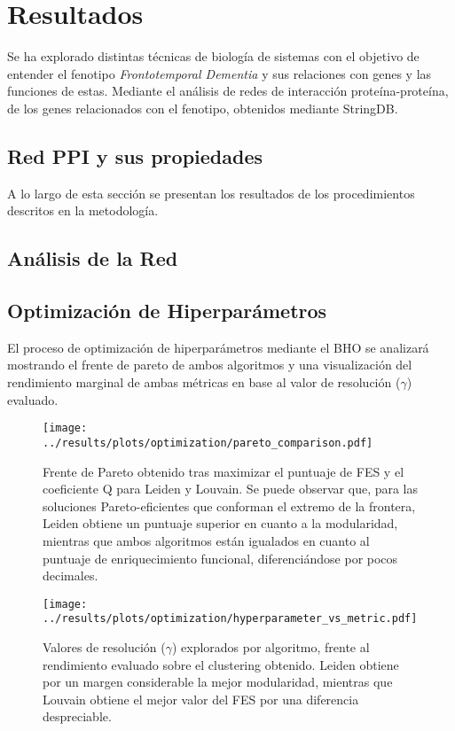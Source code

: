 \section{Resultados}
Se ha explorado distintas técnicas de biología de sistemas con el objetivo de entender el fenotipo \textit{Frontotemporal Dementia} y sus relaciones con genes y las funciones de estas. 
Mediante el análisis de redes de interacción proteína-proteína, de los genes relacionados con el fenotipo, obtenidos mediante StringDB.

\subsection{Red PPI y sus propiedades}




A lo largo de esta sección se presentan los resultados de los procedimientos descritos en la metodología. 

\subsection{Análisis de la Red}

\subsection{Optimización de Hiperparámetros}

El proceso de optimización de hiperparámetros mediante el BHO se analizará mostrando el frente de pareto de ambos algoritmos y una visualización del rendimiento marginal de ambas métricas en base al valor de resolución (\(\gamma\)) evaluado.

\begin{figure}[htbp]
	\centering
	\texttt{[image: ../results/plots/optimization/pareto\_comparison.pdf]}
	\caption{Frente de Pareto obtenido tras maximizar el puntuaje de FES y el coeficiente Q para Leiden y Louvain. Se puede observar que, para las soluciones Pareto-eficientes que conforman el extremo de la frontera, Leiden obtiene un puntuaje superior en cuanto a la modularidad, mientras que ambos algoritmos están igualados en cuanto al puntuaje de enriquecimiento funcional, diferenciándose por pocos decimales.}
	\label{fig:pareto}
\end{figure}

\begin{figure}[htbp]
	\centering
	\texttt{[image: ../results/plots/optimization/hyperparameter\_vs\_metric.pdf]}
	\caption{Valores de resolución (\(\gamma\)) explorados por algoritmo, frente al rendimiento evaluado sobre el clustering obtenido. Leiden obtiene por un margen considerable la mejor modularidad, mientras que Louvain obtiene el mejor valor del FES por una diferencia despreciable.}
	\label{fig:slice_plot}
\end{figure}


